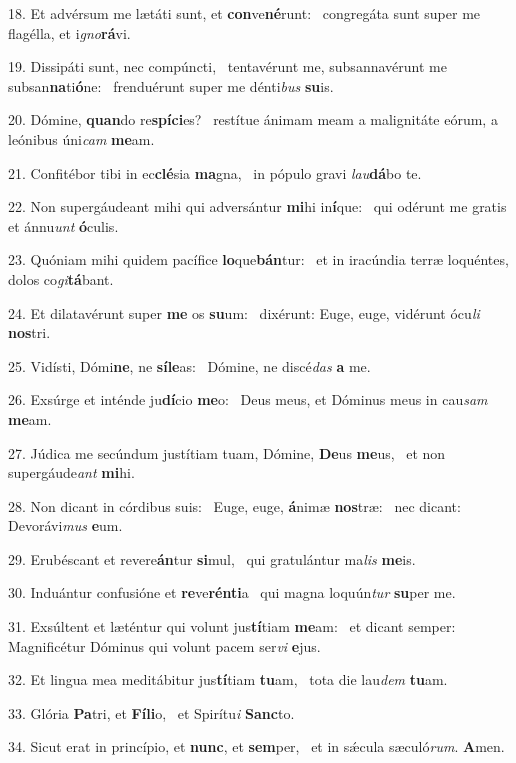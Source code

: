 18. Et advérsum me lætáti sunt, et \textbf{con}ve\textbf{né}runt: \ast\  congregáta sunt super me flagélla, et i\textit{gno}\textbf{rá}vi.\

19. Dissipáti sunt, nec compúncti, \dag\  tentavérunt me, subsannavérunt me subsan\textbf{na}ti\textbf{ó}ne: \ast\  frenduérunt super me dénti\textit{bus} \textbf{su}is.\

20. Dómine, \textbf{quan}do re\textbf{spí}\textbf{ci}es? \ast\  restítue ánimam meam a malignitáte eórum, a leónibus úni\textit{cam} \textbf{me}am.\

21. Confitébor tibi in ec\textbf{clé}sia \textbf{ma}gna, \ast\  in pópulo gravi \textit{lau}\textbf{dá}bo te.\

22. Non supergáudeant mihi qui adversántur \textbf{mi}hi in\textbf{í}que: \ast\  qui odérunt me gratis et ánnu\textit{unt} \textbf{ó}culis.\

23. Quóniam mihi quidem pacífice \textbf{lo}que\textbf{bán}tur: \ast\  et in iracúndia terræ loquéntes, dolos co\textit{gi}\textbf{tá}bant.\

24. Et dilatavérunt super \textbf{me} os \textbf{su}um: \ast\  dixérunt: Euge, euge, vidérunt ócu\textit{li} \textbf{nos}tri.\

25. Vidísti, Dómi\textbf{ne}, ne \textbf{sí}\textbf{le}as: \ast\  Dómine, ne discé\textit{das} \textbf{a} me.\

26. Exsúrge et inténde ju\textbf{dí}cio \textbf{me}o: \ast\  Deus meus, et Dóminus meus in cau\textit{sam} \textbf{me}am.\

27. Júdica me secúndum justítiam tuam, Dómine, \textbf{De}us \textbf{me}us, \ast\  et non supergáude\textit{ant} \textbf{mi}hi.\

28. Non dicant in córdibus suis: \dag\  Euge, euge, \textbf{á}nimæ \textbf{nos}træ: \ast\  nec dicant: Devorávi\textit{mus} \textbf{e}um.\

29. Erubéscant et revere\textbf{án}tur \textbf{si}mul, \ast\  qui gratulántur ma\textit{lis} \textbf{me}is.\

30. Induántur confusióne et \textbf{re}ve\textbf{rén}\textbf{ti}a \ast\  qui magna loquún\textit{tur} \textbf{su}per me.\

31. Exsúltent et læténtur qui volunt jus\textbf{tí}tiam \textbf{me}am: \ast\  et dicant semper: Magnificétur Dóminus qui volunt pacem ser\textit{vi} \textbf{e}jus.\

32. Et lingua mea meditábitur jus\textbf{tí}tiam \textbf{tu}am, \ast\  tota die lau\textit{dem} \textbf{tu}am.\

33. Glória \textbf{Pa}tri, et \textbf{Fí}\textbf{li}o, \ast\  et Spirítu\textit{i} \textbf{Sanc}to.\

34. Sicut erat in princípio, et \textbf{nunc}, et \textbf{sem}per, \ast\  et in sǽcula sæculó\textit{rum}. \textbf{A}men.\

